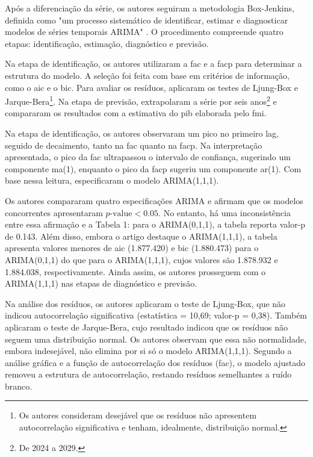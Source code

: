Após a diferenciação da série, os autores seguiram a metodologia Box-Jenkins, definida como "um processo sistemático de identificar, estimar e diagnosticar modelos de séries temporais ARIMA" . O procedimento compreende quatro etapas: identificação, estimação, diagnóstico e previsão.

Na etapa de identificação, os autores utilizaram a \ac{fac} e a \ac{facp} para determinar a estrutura do modelo. A seleção foi feita com base em critérios de informação, como o \ac{aic} e o \ac{bic}. Para avaliar os resíduos, aplicaram os testes de Ljung-Box e Jarque-Bera\footnote{Os autores consideram desejável que os resíduos não apresentem autocorrelação significativa e tenham, idealmente, distribuição normal.}. Na etapa de previsão, extrapolaram a série por seis anos\footnote{De 2024 a 2029.} e compararam os resultados com a estimativa do \ac{pib} elaborada pelo \ac{fmi}.

Na etapa de identificação, os autores observaram um pico no primeiro lag, seguido de decaimento, tanto na \ac{fac} quanto na \ac{facp}. Na interpretação apresentada, o pico da \ac{fac} ultrapassou o intervalo de confiança, sugerindo um componente \ac{ma}(1), enquanto o pico da \ac{facp} sugeriu um componente \ac{ar}(1). Com base nessa leitura, especificaram o modelo ARIMA(1,1,1).

Os autores compararam quatro especificações ARIMA e afirmam que os modelos concorrentes apresentaram $p\text{-value} < 0.05$. No entanto, há uma inconsistência entre essa afirmação e a Tabela 1: para o ARIMA(0,1,1), a tabela reporta valor-p de 0.143. Além disso, embora o artigo destaque o ARIMA(1,1,1), a tabela apresenta valores menores de \ac{aic} (1.877.420) e \ac{bic} (1.880.473) para o ARIMA(0,1,1) do que para o ARIMA(1,1,1), cujos valores são 1.878.932 e 1.884.038, respectivamente. Ainda assim, os autores prosseguem com o ARIMA(1,1,1) nas etapas de diagnóstico e previsão.

Na análise dos resíduos, os autores aplicaram o teste de Ljung-Box, que não indicou autocorrelação significativa (estatística = 10,69; valor-p = 0,38). Também aplicaram o teste de Jarque-Bera, cujo resultado indicou que os resíduos não seguem uma distribuição normal. Os autores observam que essa não normalidade, embora indesejável, não elimina por si só o modelo ARIMA(1,1,1). Segundo a análise gráfica e a função de autocorrelação dos resíduos (\ac{fac}), o modelo ajustado removeu a estrutura de autocorrelação, restando resíduos semelhantes a ruído branco.

